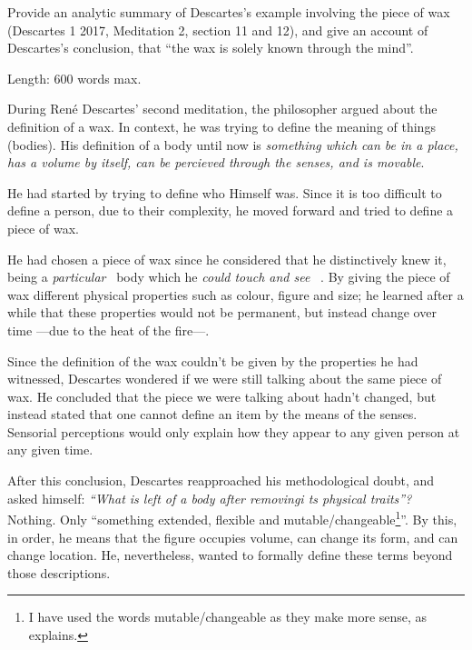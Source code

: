 \documentclass{assignment}
\begin{document}
\begin{problem}
Provide an analytic summary of Descartes’s example involving the piece of wax (Descartes 1 2017, Meditation 2, section 11 and 12), and give an account of Descartes’s conclusion, that “the wax is solely known through the mind”.%

Length: 600 words max.%
\end{problem}

\vspace*{2\baselineskip}
\begin{answer}
During René Descartes’ second meditation, the philosopher argued about the definition of a wax. In context, he was trying to define the meaning of things (bodies). His definition of a body until now is \emph{something which can be in a place, has a volume by itself, can be percieved through the senses, and is movable}.%

He had started by trying to define who Himself was. Since it is too difficult to define a person, due to their complexity, he moved forward and tried to define a piece of wax.%

\vspace*{1\baselineskip}
He had chosen a piece of wax since he considered that he distinctively knew it, being a \emph{particular}~\nocite{unipaper} body which he \emph{could touch and see} ~\autocite{unipaper}. By giving the piece of wax different physical properties such as colour, figure and size; he learned after a while that these properties would not be permanent, but instead change over time ---due to the heat of the fire---.%

Since the definition of the wax couldn't be given by the properties he had witnessed, Descartes wondered if we were still talking about the same piece of wax. He concluded that the piece we were talking about hadn't changed, but instead stated that one cannot define an item by the means of the senses. Sensorial perceptions would only explain how they appear to any given person at any given time.%

\vspace*{1\baselineskip}
After this conclusion, Descartes reapproached his methodological doubt, and asked himself: \emph{“What is left of a body after removingi ts physical traits”?}~\autocite{unipaper} Nothing. Only “something extended, flexible and mutable/changeable\footnote{I have used the words mutable/changeable as they make more sense, as \textcite{wrongword} explains.}”. By this, in order, he means that the figure occupies volume, can change its form, and can change location. He, nevertheless, wanted to formally define these terms beyond those descriptions.


\end{answer}
\end{document}
